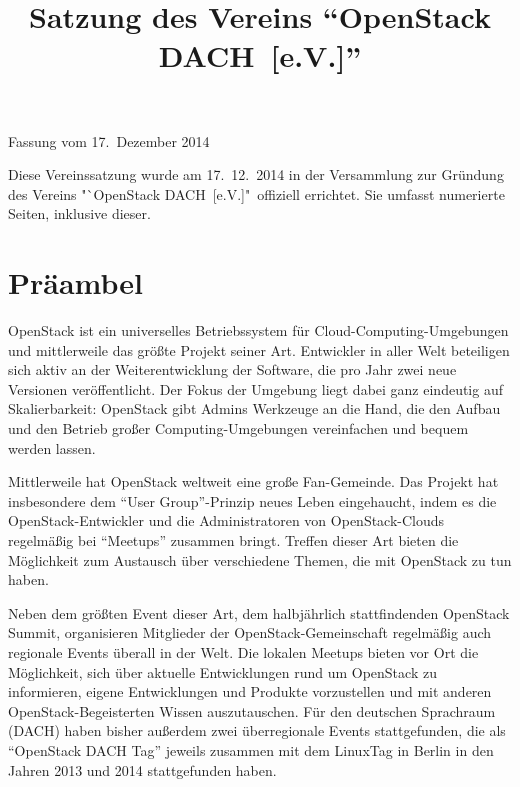 \documentclass[draft]{scrartcl}
\newcommand{\VereinsName}{OpenStack DACH}
\begin{document}

\title{Satzung des Vereins "`\VereinsName\ [e.V.]"'}
\date{}
\author{}
\def\fassungsdatum{17.\ Dezember 2014}

\begin{center}
  \LARGE \thetitle
\end{center}

\begin{flushright}
  Fassung vom \fassungsdatum
\end{flushright}

\pagestyle{scrheadings}
\clearscrheadfoot
{}

{\footnotesize Diese Vereinssatzung wurde am 17.\ 12.\ 2014 in der Versammlung
  zur Gründung des Vereins "`\VereinsName\ [e.V.]"\ offiziell errichtet. Sie
  umfasst \pageref{TotPages} numerierte Seiten, inklusive dieser.}

\bigskip

\section*{Präambel}\enlargethispage{\textheight}
\small

OpenStack ist ein universelles Betriebssystem für Cloud-Computing-Umgebungen
und mittlerweile das größte Projekt seiner Art. Entwickler in aller Welt
beteiligen sich aktiv an der Weiterentwicklung der Software, die pro Jahr
zwei neue Versionen veröffentlicht. Der Fokus der Umgebung liegt dabei ganz
eindeutig auf Skalierbarkeit: OpenStack gibt Admins Werkzeuge an die Hand,
die den Aufbau und den Betrieb großer Computing-Umgebungen vereinfachen
und bequem werden lassen.

Mittlerweile hat OpenStack weltweit eine große Fan-Gemeinde. Das Projekt hat
insbesondere dem "`User Group"'-Prinzip neues Leben eingehaucht, indem es die
OpenStack-Entwickler und die Administratoren von OpenStack-Clouds regelmäßig
bei "`Meetups"' zusammen bringt. Treffen dieser Art bieten die Möglichkeit
zum Austausch über verschiedene Themen, die mit OpenStack zu tun haben.

Neben dem größten Event dieser Art, dem halbjährlich stattfindenden OpenStack
Summit, organisieren Mitglieder der OpenStack-Gemeinschaft regelmäßig auch
regionale Events überall in der Welt. Die lokalen Meetups bieten vor Ort
die Möglichkeit, sich über aktuelle Entwicklungen rund um OpenStack zu
informieren, eigene Entwicklungen und Produkte vorzustellen und mit anderen
OpenStack-Begeisterten Wissen auszutauschen. Für den deutschen Sprachraum
(DACH) haben bisher außerdem zwei überregionale Events stattgefunden, die
als "`OpenStack DACH Tag"' jeweils zusammen mit dem LinuxTag in Berlin in
den Jahren 2013 und 2014 stattgefunden haben.
\end{document}
